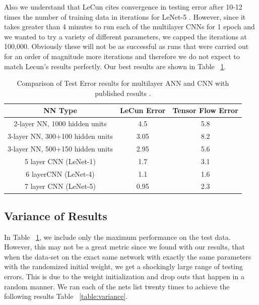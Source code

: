\documentclass[12pt, twocolumn]{article}
\begin{document}
Also we understand that LeCun cites convergence in testing error after 10-12 times the number of training data in iterations for LeNet-5 \cite{LeCun1998}. However, since it takes greater than 4 minutes to run each of the multilayer CNNs for 1 epoch and we wanted to try a variety of different parameters, we capped the iterations at 100,000. Obviously these will not be as successful as runs that were carried out for an order of magnitude more iterations and therefore we do not expect to match Lecun's results perfectly.  Our best results are shown in Table ~\ref{table:MNISTLeCun}. 

\begin{table}
\begin{center}
\begin{tabular} { |c | c | c | }
    \hline
    NN Type & LeCun Error  &   Tensor Flow Error \\ \hline
    2-layer NN, 1000 hidden units & 4.5  & 5.8\\ \hline
    3-layer NN, 300+100 hidden units & 3.05  & 8.2 \\ \hline
    3-layer NN, 500+150 hidden units & 2.95  & 5.6\\ \hline
    5 layer CNN  (LeNet-1) & 1.7  & 3.1\\ \hline 
    6 layerCNN (LeNet-4) & 1.1 & 1.6\\ \hline 
    7 layer CNN (LeNet-5) &  0.95  & 2.3\\ \hline
  \end{tabular}
\caption{Comparison of Test Error results for multilayer ANN and CNN with published results \cite{LeCun1998}.}
\label{table:MNISTLeCun}
\end{center}
\end{table}


\subsection{Variance of Results}
In Table ~\ref{table:MNISTLeCun}, we include only the maximum performance on the test data. However, this may not be a great metric since we found with our results, that when the data-set on the exact same network with exactly the same parameters with the randomized initial weight, we get a shockingly large range of testing errors. This is due to the weight initialization and drop outs that happen in a random manner. We ran each of the nets list twenty times  to achieve the following results Table ~\ref{table:variance}.
\end{document}
